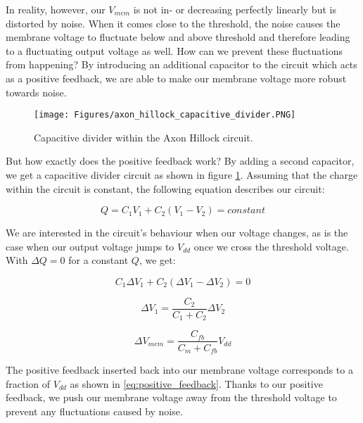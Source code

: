 In reality, however, our $V_{mem}$ is not in- or decreasing perfectly linearly but is distorted by noise. When it comes close to the threshold, the noise causes the membrane voltage to fluctuate below and above threshold and therefore leading to a fluctuating output voltage as well. How can we prevent these fluctuations from happening? By introducing an additional capacitor to the circuit which acts as a positive feedback, we are able to make our membrane voltage more robust towards noise.\\

\begin{figure}
    \centering
    \texttt{[image: Figures/axon\_hillock\_capacitive\_divider.PNG]}
    \caption{Capacitive divider within the Axon Hillock circuit.}
    \label{fig:axon_hillock_capacitive_divider}
\end{figure}

But how exactly does the positive feedback work? By adding a second capacitor, we get a capacitive divider circuit as shown in figure \ref{fig:axon_hillock_capacitive_divider}. Assuming that the charge within the circuit is constant, the following equation describes our circuit:

\begin{equation}
    Q = C_1 V_1 + C_2 (V_1 - V_2) = constant
\end{equation}

We are interested in the circuit's behaviour when our voltage changes, as is the case when our output voltage jumps to $V_{dd}$ once we cross the threshold voltage. With $\Delta Q = 0$ for a constant $Q$, we get:

\begin{equation}
    C_1 \Delta V_1 + C_2 (\Delta V_1 - \Delta V_2) = 0
\end{equation}

\begin{equation}
    \Delta V_1 = \frac{C_2}{C_1 + C_2} \Delta V_2
\end{equation}

\begin{equation}
    \Delta V_{mem} = \frac{C_{fb}}{C_m + C_{fb}} V_{dd} \label{eq:positive_feedback}
\end{equation}

The positive feedback inserted back into our membrane voltage corresponds to a fraction of $V_{dd}$ as shown in \eqref{eq:positive_feedback}. Thanks to our positive feedback, we push our membrane voltage away from the threshold voltage to prevent any fluctuations caused by noise.\\

